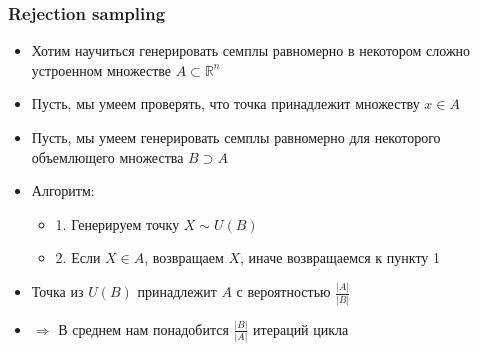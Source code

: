 \documentclass[10pt]{beamer}
\begin{document}
\begin{frame}[fragile]
\frametitle{Rejection sampling}
\begin{itemize}
\item Хотим научиться генерировать семплы равномерно в некотором сложно устроенном множестве \begin{math}A \subset \mathbb R^n\end{math}
\pause
\item Пусть, мы умеем проверять, что точка принадлежит множеству \begin{math}x \in A\end{math}
\pause
\item Пусть, мы умеем генерировать семплы равномерно для некоторого объемлющего множества \begin{math}B\supset A\end{math}
\pause
\item Алгоритм:
\pause
\begin{itemize}
\item 1. Генерируем точку \begin{math}X \sim U(B)\end{math}
\pause
\item 2. Если \begin{math}X \in A\end{math}, возвращаем \begin{math}X\end{math}, иначе возвращаемся к пункту 1
\end{itemize}
\pause
\item Точка из \begin{math}U(B)\end{math} принадлежит \begin{math}A\end{math} с вероятностью \begin{math}\frac{|A|}{|B|}\end{math}
\pause
\item \begin{math}\Longrightarrow\end{math} В среднем нам понадобится \begin{math}\frac{|B|}{|A|}\end{math} итераций цикла
\end{itemize}
\end{frame}
\end{document}

